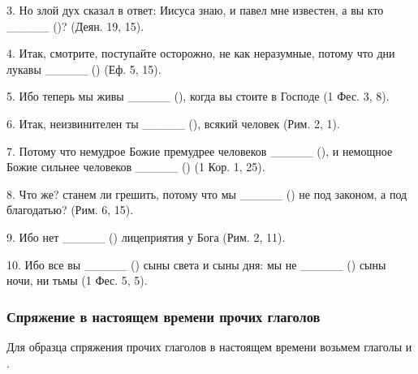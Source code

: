 \documentclass[11pt,a4paper,oneside]{memoir}
\begin{document}
    3. Но злой дух сказал в ответ: Иисуса знаю, и павел мне известен, а вы кто _____ ({})? (Деян. 19, 15).
    
    4. Итак, смотрите, поступайте осторожно, не как неразумные, потому что дни лукавы _____ ({}) (Еф. 5, 15).
    
    5. Ибо теперь мы живы _____ ({}), когда вы стоите в Господе (1 Фес. 3, 8).
    
    6. Итак, неизвинителен ты _____ ({}), всякий человек (Рим. 2, 1).
    
    7. Потому что немудрое Божие премудрее человеков _____ ({}), и немощное Божие сильнее человеков _____ ({}) (1 Кор. 1, 25).
    
    8. Что же? станем ли грешить, потому что мы _____ ({}) не под законом, а под благодатью? (Рим. 6, 15).
    
    9. Ибо нет _____ ({}) лицеприятия у Бога (Рим. 2, 11).
    
    10. Ибо все вы _____ ({}) сыны света и сыны дня: мы не _____ ({}) сыны ночи, ни тьмы (1 Фес. 5, 5).
    \pagebreak
    
                \subsubsection{Спряжение в настоящем времени прочих глаголов}

    Для образца спряжения прочих глаголов в настоящем времени возьмем глаголы {} и {}.
    
\end{document}
